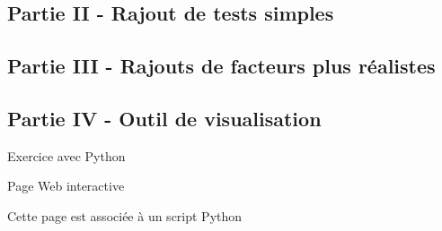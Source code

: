 \documentclass[]{article}
\begin{document}
\hypertarget{partie-ii---rajout-de-tests-simples}{%
\subsection{\texorpdfstring{ Partie II - Rajout de tests
simples}{ Partie II - Rajout de tests simples}}\label{partie-ii---rajout-de-tests-simples}}

\hypertarget{partie-iii---rajouts-de-facteurs-plus-ruxe9alistes}{%
\subsection{\texorpdfstring{ Partie III - Rajouts de facteurs plus
réalistes}{ Partie III - Rajouts de facteurs plus réalistes}}\label{partie-iii---rajouts-de-facteurs-plus-ruxe9alistes}}

\hypertarget{partie-iv---outil-de-visualisation}{%
\subsection{\texorpdfstring{ Partie IV - Outil de
visualisation}{ Partie IV - Outil de visualisation}}\label{partie-iv---outil-de-visualisation}}

Exercice avec Python

Page Web interactive

Cette page est associée à un script Python
\end{document}
